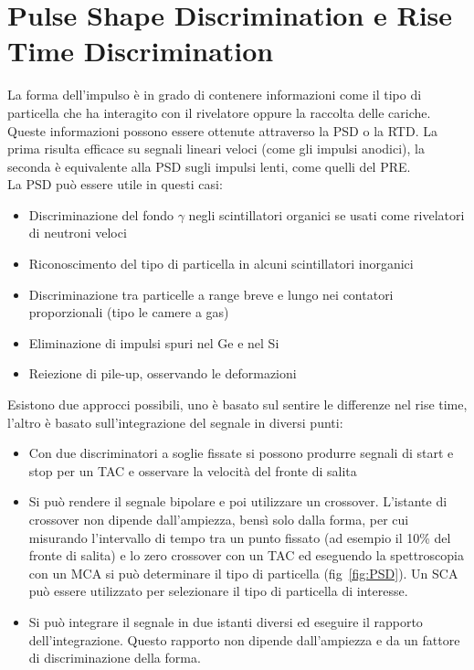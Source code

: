 \section{Pulse Shape Discrimination e Rise Time Discrimination}
La forma dell'impulso \`e in grado di contenere informazioni come il tipo di particella che ha interagito con il rivelatore oppure la raccolta delle cariche.
Queste informazioni possono essere ottenute attraverso la PSD o la RTD.
La prima risulta efficace su segnali lineari veloci (come gli impulsi anodici), la seconda \`e equivalente alla PSD sugli impulsi lenti, come quelli del PRE.\\
La PSD pu\`o essere utile in questi casi:
\begin{itemize}
\item	Discriminazione del fondo $\gamma$ negli scintillatori organici se usati come rivelatori di neutroni veloci
\item Riconoscimento del tipo di particella in alcuni scintillatori inorganici
\item Discriminazione tra particelle a range breve e lungo nei contatori proporzionali (tipo le camere a gas)
\item Eliminazione di impulsi spuri nel Ge e nel Si
\item Reiezione di pile-up, osservando le deformazioni
\end{itemize}
Esistono due approcci possibili, uno \`e basato sul sentire le differenze nel rise time, l'altro \`e basato sull'integrazione del segnale in diversi punti:
\begin{itemize}
\item Con due discriminatori a soglie fissate si possono produrre segnali di start e stop per un TAC e osservare la velocit\`a del fronte di salita
\item Si pu\`o rendere il segnale bipolare e poi utilizzare un crossover. 
L'istante di crossover non dipende dall'ampiezza, bens\`i solo dalla forma, per cui misurando l'intervallo di tempo tra un punto fissato (ad esempio il 10\% del fronte di salita)
e lo zero crossover con un TAC ed eseguendo la spettroscopia con un MCA si pu\`o determinare il tipo di particella (fig~\ref{fig:PSD}). 
Un SCA pu\`o essere utilizzato per selezionare il tipo di particella di interesse.
\item Si pu\`o integrare il segnale in due istanti diversi ed eseguire il rapporto dell'integrazione. Questo rapporto non dipende dall'ampiezza e da un
fattore di discriminazione della forma.
\end{itemize}
